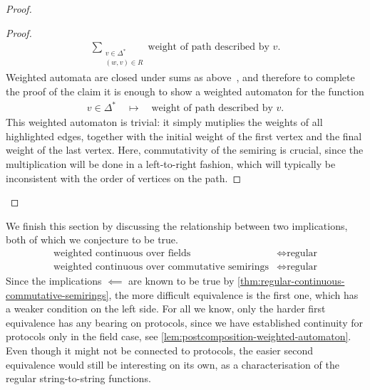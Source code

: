 \begin{proof}
\begin{proof}
\begin{align*}
    \sum_{\substack{v \in \Delta^* \\ (w,v) \in R}} \text{weight of path described by $v$}.
    \end{align*} 
    Weighted automata are closed under sums as above~\cite[Lemma 8.12]{bojanczyk_automata_2025}, and therefore to complete the proof of the claim it is enough to show a weighted automaton for the function
    \begin{align*}
    v \in \Delta^* 
    \quad \mapsto \quad 
    \text{weight of path described by $v$}.
    \end{align*}
    This weighted automaton is trivial: it simply mutiplies the weights of all highlighted edges, together with the initial weight of the first vertex and the final weight of the last vertex. Here, commutativity of the semiring is crucial, since the multiplication will be done in a left-to-right fashion, which will typically be inconsistent with the order of vertices on the path. 
\end{proof}

\end{proof}

We finish this section by discussing the relationship between two implications, both of which we conjecture to be true.
\begin{align}
\text{weighted continuous over fields}
& \iff
\text{regular}
\label{eq:weighted-continuous-fields-again}\\
    \text{weighted continuous over commutative semirings}
& \iff
\text{regular}
\label{eq:weighted-continuous-commutative-semirings-again}
\end{align}
Since the implications $\impliedby$ are known to be true by \cref{thm:regular-continuous-commutative-semirings}, the more difficult equivalence is the first one, which has a weaker condition on the left side. 
For all we know, only the harder  first equivalence has any bearing on protocols, since we have established continuity for protocols only in the field case, see \cref{lem:postcomposition-weighted-automaton}. Even though it might not be connected to protocols, the  easier second equivalence would still be interesting on its own, as a characterisation of the regular string-to-string functions.
